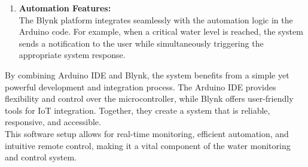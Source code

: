 {\begin{enumerate}
    \begin{itemize}
      \item Users can control the water pump remotely through the Blynk app.
      \item Manual overrides are supported, allowing users to activate or deactivate the pump as needed, irrespective of the automation logic.
    \end{itemize}
  \item \textbf{Automation Features:}\\
    The Blynk platform integrates seamlessly with the automation logic in the Arduino code. For example, when a critical water level is reached, the system sends a notification to the user while simultaneously triggering the appropriate system response.
\end{enumerate}

\noindent
By combining Arduino IDE and Blynk, the system benefits from a simple yet powerful development and integration process. The Arduino IDE provides flexibility and control over the microcontroller, while Blynk offers user-friendly tools for IoT integration. Together, they create a system that is reliable, responsive, and accessible.\\
\noindent
This software setup allows for real-time monitoring, efficient automation, and intuitive remote control, making it a vital component of the water monitoring and control system.
}
    